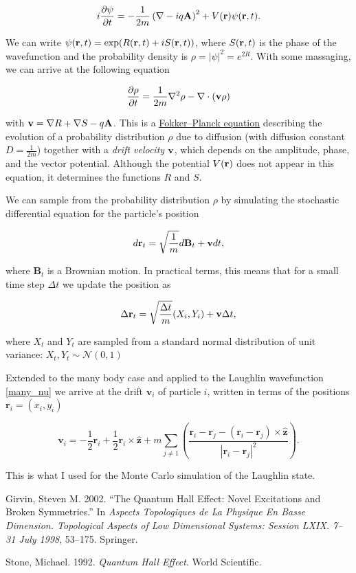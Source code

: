 \documentclass[
  letterpaper,
  DIV=11,
  numbers=noendperiod]{scrreprt}
\newlength{\cslhangindent}
\newenvironment{CSLReferences}[2] %
 {\begin{list}{}{%
  \setlength{\itemindent}{0pt}
  \setlength{\leftmargin}{0pt}
  \setlength{\parsep}{0pt}
  \ifodd #1
   \setlength{\leftmargin}{\cslhangindent}
   \setlength{\itemindent}{-1\cslhangindent}
  \fi
  \setlength{\itemsep}{#2\baselineskip}}}
 {\end{list}}
\begin{document}
\[
i\frac{\partial\psi}{\partial t} = -\frac{1}{2m}\left(\nabla -iq\mathbf{A}\right)^2 + V(\mathbf{r})\psi(\mathbf{r},t).
\]

We can write \(\psi(\mathbf{r}, t) = \exp(R(\mathbf{r}, t) + iS(\mathbf{r}, t))\), where
\(S(\mathbf{r},t)\) is the phase of the wavefunction and the probability
density is \(\rho=|\psi|^2 = e^{2R}\). With some massaging, we can
arrive at the following equation

\[
\frac{\partial \rho}{\partial t} = \frac{1}{2m}\nabla^2\rho - \nabla\cdot\left(\mathbf{v} \rho\right)
\]

with \(\mathbf{v} = \nabla R + \nabla S - q\mathbf{A}\). This is a
\href{https://en.wikipedia.org/wiki/Fokker\%E2\%80\%93Planck_equation}{Fokker--Planck
equation} describing the evolution of a probability distribution
\(\rho\) due to diffusion (with diffusion constant \(D=\frac{1}{2m}\))
together with a \emph{drift velocity} \(\mathbf{v}\), which depends on the
amplitude, phase, and the vector potential. Although the potential
\(V(\mathbf{r})\) does not appear in this equation, it determines the functions
\(R\) and \(S\).

We can sample from the probability distribution \(\rho\) by simulating
the stochastic differential equation for the particle's position

\[
d\mathbf{r}_t = \sqrt{\frac{1}{m}}d\mathbf{B}_t + \mathbf{v}dt,
\]

where \(\mathbf{B}_t\) is a Brownian motion. In practical terms, this
means that for a small time step \(\Delta t\) we update the position as

\[
\Delta \mathbf{r}_t = \sqrt{\frac{\Delta t}{m}}(X_i, Y_i)  + \mathbf{v}\Delta t,
\]

where \(X_t\) and \(Y_t\) are sampled from a standard normal
distribution of unit variance: \(X_t, Y_t \sim \mathcal{N}(0,1)\)

Extended to the many body case and applied to the Laughlin wavefunction
\eqref{many_nu} we arrive at the drift \(\mathbf{v}_i\) of particle
\(i\), written in terms of the positions \(\mathbf{r}_i = (x_i, y_i)\)

\[
\mathbf{v}_i = -\frac{1}{2}\mathbf{r}_i + \frac{1}{2} \mathbf{r}_i \times \hat{\mathbf{z}} + m \sum_{j\neq 1} \left(\frac{\mathbf{r}_i - \mathbf{r}_j - (\mathbf{r}_i - \mathbf{r}_j)\times \hat{\mathbf{z}}}{|\mathbf{r}_i-\mathbf{r}_j|^2}\right).
\]

This is what I used for the Monte Carlo simulation of the Laughlin
state.

\label{refs}
\begin{CSLReferences}{1}{0}
Girvin, Steven M. 2002. {``The Quantum Hall Effect: Novel Excitations
and Broken Symmetries.''} In \emph{Aspects Topologiques de La Physique
En Basse Dimension. Topological Aspects of Low Dimensional Systems:
Session LXIX. 7--31 July 1998}, 53--175. Springer.

Stone, Michael. 1992. \emph{Quantum Hall Effect}. World Scientific.

\end{CSLReferences}
\end{document}
